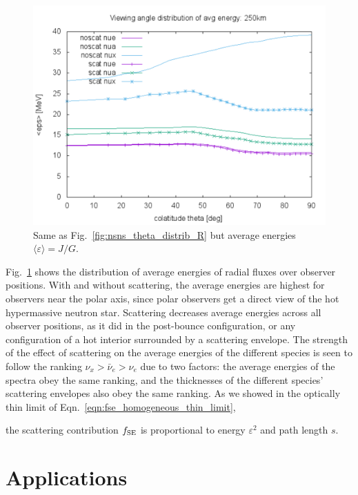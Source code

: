 \documentclass[aps,floatfix,prd,superscriptaddress,twocolumn]{revtex4-1}
\newcommand{\todo}[1]{\marginpar{\tiny{\textcolor{red}{#1}}}}
\renewcommand\todo[1]{} %
\begin{document}
\begin{figure}
  \includegraphics[width=\columnwidth]{theta_distrib-250km-avg_eps}
  \caption{Same as Fig.~\ref{fig:nsns_theta_distrib_R} but
    average energies $\langle \varepsilon \rangle = J/G$.}
  \label{fig:nsns_theta_distrib_avg_eps}
\end{figure}

Fig.~\ref{fig:nsns_theta_distrib_avg_eps} shows the distribution of
average energies of radial fluxes over observer positions.
With and without scattering, the average energies are highest
for observers near the polar axis, since polar observers get a
direct view of the hot hypermassive neutron star.
Scattering decreases average energies across all observer positions,
as it did in the post-bounce configuration, or any configuration of
a hot interior surrounded by a scattering envelope.
The strength of the effect of scattering on the average energies of
the different species is seen to follow the ranking
$\nu_x>\bar{\nu}_e>\nu_e$ due to two factors:
the average energies of the spectra obey the same ranking,
and the thicknesses of the different species' scattering envelopes
also obey the same ranking.
As we showed in the optically thin limit of
Eqn.~\ref{eqn:fse_homogeneous_thin_limit},
\todo{too simplistic}
the scattering contribution $f_{\rm SE}$ is
proportional to energy $\varepsilon^2$ and path length $s$.

\section{Applications}
\label{sec:applications}
\end{document}
